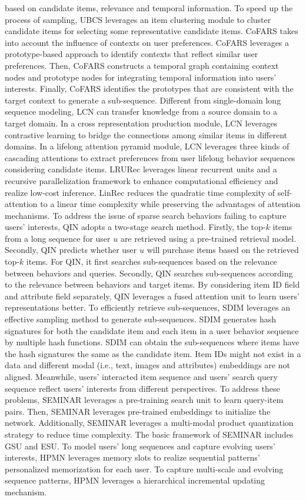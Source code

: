 \documentclass[review]{fcs}
\begin{document}
based on candidate items, relevance and temporal information. To speed up the process of sampling, UBCS leverages an item clustering module to cluster candidate items for selecting some representative candidate items. CoFARS \cite{CoFARS} takes into account the influence of contexts on user preferences. CoFARS leverages a prototype-based approach to identify contexts that reflect similar user preferences. Then, CoFARS constructs a temporal graph containing context nodes and prototype nodes for integrating temporal information into users’ interests. Finally, CoFARS identifies the prototypes that are consistent with the target context to generate a sub-sequence. Different from single-domain long sequence modeling, LCN \cite{LCN} can transfer knowledge from a source domain to a target domain. In a cross representation production module, LCN leverages contrastive learning to bridge the connections among similar items in different domains. In a lifelong attention pyramid module, LCN leverages three kinds of cascading attentions to extract preferences from user lifelong behavior sequences considering candidate items. LRURec \cite{LRURec} leverages linear recurrent units and a recursive parallelization framework to enhance computational efficiency and realize low-cost inference. LinRec \cite{LinRec} reduces the quadratic time complexity of self-attention to a linear time complexity while preserving the advantages of attention mechanisms. To address the issue of sparse search behaviors failing to capture users’ interests, QIN \cite{QIN} adopts a two-stage search method. Firstly, the top-$k$ items from a long sequence for user $u$ are retrieved using a pre-trained retrieval model. Secondly, QIN predicts whether user $u$ will purchase items based on the retrieved top-$k$ items. For QIN, it first searches sub-sequences based on the relevance between behaviors and queries. Secondly, QIN searches sub-sequences according to the relevance between behaviors and target items. By considering item ID field and attribute field separately, QIN leverages a fused attention unit to learn users’ representations better. To efficiently retrieve sub-sequences, SDIM \cite{SDIM} leverages an effective sampling method to generate sub-sequences. SDIM generates hash signatures for both the candidate item and each item in a user behavior sequence by multiple hash functions. SDIM can obtain the sub-sequences where items have the hash signatures the same as the candidate item. Item IDs might not exist in a data and different modal (i.e., text, images and attributes) embeddings are not aligned. Meanwhile, users’ interacted item sequence and users’ search query sequence reflect users’ interests from different perspectives. To address these problems, SEMINAR \cite{SEMINAR} leverages a pre-training search unit to learn query-item pairs. Then, SEMINAR leverages pre-trained embeddings to initialize the network. Additionally, SEMINAR leverages a multi-modal product quantization strategy to reduce time complexity. The basic framework of SEMINAR includes GSU and ESU. To model users’ long sequences and capture evolving users’ interests, HPMN \cite{HPMN}  leverages memory slots to realize sequential patterns’ personalized memorization for each user. To capture multi-scale and evolving sequence patterns, HPMN leverages a hierarchical incremental updating mechanism.
\end{document}
